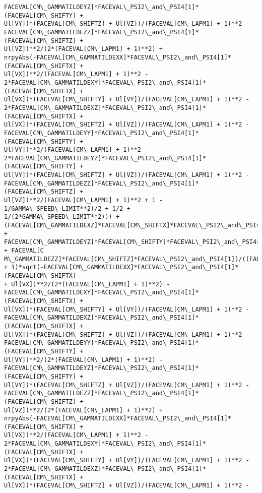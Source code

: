 \documentclass[landscape,letterpaper,10pt,english]{article}
\begin{document}
\begin{Verbatim}[commandchars=\\\{\}]
FACEVAL[CM\_GAMMATILDEYZ]*FACEVAL\_PSI2\_and\_PSI4[1]*(FACEVAL[CM\_SHIFTY] +
Ul[VY])*(FACEVAL[CM\_SHIFTZ] + Ul[VZ])/(FACEVAL[CM\_LAPM1] + 1)**2 -
FACEVAL[CM\_GAMMATILDEZZ]*FACEVAL\_PSI2\_and\_PSI4[1]*(FACEVAL[CM\_SHIFTZ] +
Ul[VZ])**2/(2*(FACEVAL[CM\_LAPM1] + 1)**2) +
nrpyAbs(-FACEVAL[CM\_GAMMATILDEXX]*FACEVAL\_PSI2\_and\_PSI4[1]*(FACEVAL[CM\_SHIFTX] +
Ul[VX])**2/(FACEVAL[CM\_LAPM1] + 1)**2 -
2*FACEVAL[CM\_GAMMATILDEXY]*FACEVAL\_PSI2\_and\_PSI4[1]*(FACEVAL[CM\_SHIFTX] +
Ul[VX])*(FACEVAL[CM\_SHIFTY] + Ul[VY])/(FACEVAL[CM\_LAPM1] + 1)**2 -
2*FACEVAL[CM\_GAMMATILDEXZ]*FACEVAL\_PSI2\_and\_PSI4[1]*(FACEVAL[CM\_SHIFTX] +
Ul[VX])*(FACEVAL[CM\_SHIFTZ] + Ul[VZ])/(FACEVAL[CM\_LAPM1] + 1)**2 -
FACEVAL[CM\_GAMMATILDEYY]*FACEVAL\_PSI2\_and\_PSI4[1]*(FACEVAL[CM\_SHIFTY] +
Ul[VY])**2/(FACEVAL[CM\_LAPM1] + 1)**2 -
2*FACEVAL[CM\_GAMMATILDEYZ]*FACEVAL\_PSI2\_and\_PSI4[1]*(FACEVAL[CM\_SHIFTY] +
Ul[VY])*(FACEVAL[CM\_SHIFTZ] + Ul[VZ])/(FACEVAL[CM\_LAPM1] + 1)**2 -
FACEVAL[CM\_GAMMATILDEZZ]*FACEVAL\_PSI2\_and\_PSI4[1]*(FACEVAL[CM\_SHIFTZ] +
Ul[VZ])**2/(FACEVAL[CM\_LAPM1] + 1)**2 + 1 - 1/GAMMA\_SPEED\_LIMIT**2)/2 + 1/2 +
1/(2*GAMMA\_SPEED\_LIMIT**2))) +
(FACEVAL[CM\_GAMMATILDEXZ]*FACEVAL[CM\_SHIFTX]*FACEVAL\_PSI2\_and\_PSI4[1] +
FACEVAL[CM\_GAMMATILDEYZ]*FACEVAL[CM\_SHIFTY]*FACEVAL\_PSI2\_and\_PSI4[1] + FACEVAL[C
M\_GAMMATILDEZZ]*FACEVAL[CM\_SHIFTZ]*FACEVAL\_PSI2\_and\_PSI4[1])/((FACEVAL[CM\_LAPM1]
+ 1)*sqrt(-FACEVAL[CM\_GAMMATILDEXX]*FACEVAL\_PSI2\_and\_PSI4[1]*(FACEVAL[CM\_SHIFTX]
+ Ul[VX])**2/(2*(FACEVAL[CM\_LAPM1] + 1)**2) -
FACEVAL[CM\_GAMMATILDEXY]*FACEVAL\_PSI2\_and\_PSI4[1]*(FACEVAL[CM\_SHIFTX] +
Ul[VX])*(FACEVAL[CM\_SHIFTY] + Ul[VY])/(FACEVAL[CM\_LAPM1] + 1)**2 -
FACEVAL[CM\_GAMMATILDEXZ]*FACEVAL\_PSI2\_and\_PSI4[1]*(FACEVAL[CM\_SHIFTX] +
Ul[VX])*(FACEVAL[CM\_SHIFTZ] + Ul[VZ])/(FACEVAL[CM\_LAPM1] + 1)**2 -
FACEVAL[CM\_GAMMATILDEYY]*FACEVAL\_PSI2\_and\_PSI4[1]*(FACEVAL[CM\_SHIFTY] +
Ul[VY])**2/(2*(FACEVAL[CM\_LAPM1] + 1)**2) -
FACEVAL[CM\_GAMMATILDEYZ]*FACEVAL\_PSI2\_and\_PSI4[1]*(FACEVAL[CM\_SHIFTY] +
Ul[VY])*(FACEVAL[CM\_SHIFTZ] + Ul[VZ])/(FACEVAL[CM\_LAPM1] + 1)**2 -
FACEVAL[CM\_GAMMATILDEZZ]*FACEVAL\_PSI2\_and\_PSI4[1]*(FACEVAL[CM\_SHIFTZ] +
Ul[VZ])**2/(2*(FACEVAL[CM\_LAPM1] + 1)**2) +
nrpyAbs(-FACEVAL[CM\_GAMMATILDEXX]*FACEVAL\_PSI2\_and\_PSI4[1]*(FACEVAL[CM\_SHIFTX] +
Ul[VX])**2/(FACEVAL[CM\_LAPM1] + 1)**2 -
2*FACEVAL[CM\_GAMMATILDEXY]*FACEVAL\_PSI2\_and\_PSI4[1]*(FACEVAL[CM\_SHIFTX] +
Ul[VX])*(FACEVAL[CM\_SHIFTY] + Ul[VY])/(FACEVAL[CM\_LAPM1] + 1)**2 -
2*FACEVAL[CM\_GAMMATILDEXZ]*FACEVAL\_PSI2\_and\_PSI4[1]*(FACEVAL[CM\_SHIFTX] +
Ul[VX])*(FACEVAL[CM\_SHIFTZ] + Ul[VZ])/(FACEVAL[CM\_LAPM1] + 1)**2 -

\end{Verbatim}
\end{document}
